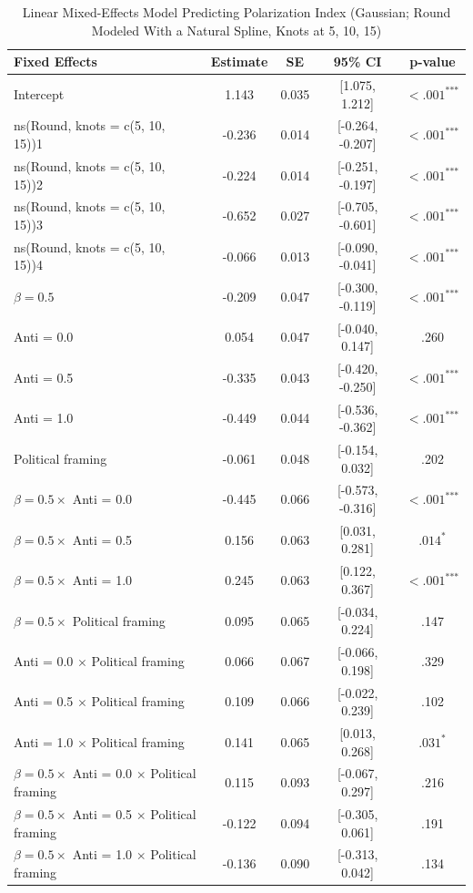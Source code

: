 \begin{table}[H]
\centering
\caption{Linear Mixed-Effects Model Predicting Polarization Index (Gaussian; Round Modeled With a Natural Spline, Knots at 5, 10, 15)}
\label{tab:lmm_results_pi_gaussian_best}
\begingroup
\footnotesize
\renewcommand{\arraystretch}{0.90} %

\begin{tabularx}{\linewidth}{Xcccc}
\toprule
\textbf{Fixed Effects} & \textbf{Estimate} & \textbf{SE} & \textbf{95\% CI} & \textbf{p-value} \\
\midrule
Intercept & 1.143 & 0.035 & [1.075, 1.212] & $< .001^{\text{***}}$ \\
ns(Round, knots = c(5, 10, 15))1 & -0.236 & 0.014 & [-0.264, -0.207] & $< .001^{\text{***}}$ \\
ns(Round, knots = c(5, 10, 15))2 & -0.224 & 0.014 & [-0.251, -0.197] & $< .001^{\text{***}}$ \\
ns(Round, knots = c(5, 10, 15))3 & -0.652 & 0.027 & [-0.705, -0.601] & $< .001^{\text{***}}$ \\
ns(Round, knots = c(5, 10, 15))4 & -0.066 & 0.013 & [-0.090, -0.041] & $< .001^{\text{***}}$ \\
$\beta = 0.5$ & -0.209 & 0.047 & [-0.300, -0.119] & $< .001^{\text{***}}$ \\
Anti = 0.0 & 0.054 & 0.047 & [-0.040, 0.147] & .260 \\
Anti = 0.5 & -0.335 & 0.043 & [-0.420, -0.250] & $< .001^{\text{***}}$ \\
Anti = 1.0 & -0.449 & 0.044 & [-0.536, -0.362] & $< .001^{\text{***}}$ \\
Political framing & -0.061 & 0.048 & [-0.154, 0.032] & .202 \\
$\beta = 0.5 \times$ Anti = 0.0 & -0.445 & 0.066 & [-0.573, -0.316] & $< .001^{\text{***}}$ \\
$\beta = 0.5 \times$ Anti = 0.5 & 0.156 & 0.063 & [0.031, 0.281] & $.014^{\text{*}}$ \\
$\beta = 0.5 \times$ Anti = 1.0 & 0.245 & 0.063 & [0.122, 0.367] & $< .001^{\text{***}}$ \\
$\beta = 0.5 \times$ Political framing & 0.095 & 0.065 & [-0.034, 0.224] & .147 \\
Anti = 0.0 $\times$ Political framing & 0.066 & 0.067 & [-0.066, 0.198] & .329 \\
Anti = 0.5 $\times$ Political framing & 0.109 & 0.066 & [-0.022, 0.239] & .102 \\
Anti = 1.0 $\times$ Political framing & 0.141 & 0.065 & [0.013, 0.268] & $.031^{\text{*}}$ \\
$\beta = 0.5 \times$ Anti = 0.0 $\times$ Political framing & 0.115 & 0.093 & [-0.067, 0.297] & .216 \\
$\beta = 0.5 \times$ Anti = 0.5 $\times$ Political framing & -0.122 & 0.094 & [-0.305, 0.061] & .191 \\
$\beta = 0.5 \times$ Anti = 1.0 $\times$ Political framing & -0.136 & 0.090 & [-0.313, 0.042] & .134 \\


\end{tabularx}
\end{table}
